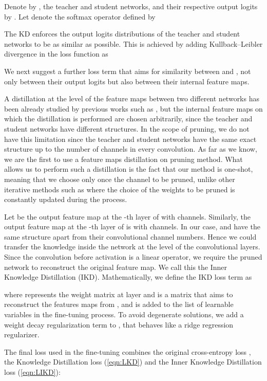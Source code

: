 \documentclass{article}
\begin{document}
Denote by , the teacher and student networks, and their respective output logits by . 
Let  denote the softmax operator defined by

The KD enforces the output logits distributions of the teacher and student networks to be as similar as possible.  This is achieved by adding  Kullback–Leibler divergence in the loss function as


\vspace{-10pt}We next suggest a further loss term that aims for similarity between  and , not only between their output logits but also between their internal feature maps.

A distillation at the level of the feature maps between two different networks has been already studied by previous works such as \cite{fitnets, Heo_2019_ICCV}, but the internal feature maps on which the distillation is performed are chosen arbitrarily, since the teacher and student networks have different structures. In the scope of pruning, we do not have this limitation since the teacher and student networks have the same exact structure up to the number of channels in every convolution. As far as we know, we are the first to use a feature maps distillation on pruning method. What allows us to perform such a distillation is the fact that our method is one-shot, meaning that we choose only once the channel to be pruned, unlike other iterative methods such as \cite{CCP, FPGM, TAS} where the choice of the weights to be pruned is constantly updated during the process. 
 


Let  be the output feature map at the -th layer of  with  channels.
Similarly, the output feature map at the -th layer of  is  with  channels.
In our case,  and  have the same structure apart from their convolutional channel numbers. 
Hence we could transfer the knowledge inside the network at the level of the convolutional layers. Since the convolution before activation is a linear operator, we require the pruned network to reconstruct the original feature map. We call this the Inner Knowledge Distillation (IKD). Mathematically, we define the IKD loss term as

where  represents the weight matrix at layer  and  is a  matrix that aims to reconstruct the features maps  from , and is added to the list of learnable variables in the fine-tuning process. To avoid degenerate solutions, we add a weight decay regularization term to , that behaves like a ridge regression regularizer.

The final loss used in the fine-tuning combines the original cross-entropy loss , the Knowledge Distillation loss (\ref{eqn:LKD}) and the Inner Knowledge Distillation loss (\ref{eqn:LIKD}):
\end{document}
